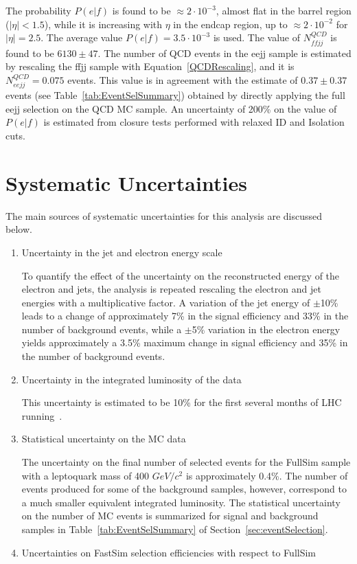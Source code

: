 \documentclass{cmspaper}
\begin{document}
\begin{linenumbers}
The probability $P(e|f)$ is found to be $\approx 2 \cdot 10^{-3}$, almost flat in the barrel region ($|\eta|<1.5$), while 
it is increasing with $\eta$ in the endcap region, up to $\approx 2 \cdot 10^{-2}$ for $|\eta|=2.5$. 
The average value $P(e|f) = 3.5 \cdot 10^{-3}$ is used.
The value of $N_{ffjj}^{QCD}$ is found to be $6130 \pm 47$. The number of QCD events in the eejj sample is estimated 
by rescaling the ffjj sample with Equation~\ref{QCDRescaling}, and it is $N_{eejj}^{QCD}=0.075$ events.
This value is in agreement with the estimate of $0.37 \pm 0.37$ events 
(see Table~\ref{tab:EventSelSummary}) obtained by directly applying the full eejj 
selection on the QCD MC sample. An uncertainty of 200\% on the value of $P(e|f)$ is estimated 
from closure tests performed with relaxed ID and Isolation cuts. 

\section{Systematic Uncertainties} \label{sec:Systematics}

The main sources of systematic uncertainties for this analysis are discussed below.

%
\begin{enumerate}
\item Uncertainty in the jet and electron energy scale

To quantify the effect of the uncertainty on the reconstructed energy of the electron and jets,
the analysis is repeated rescaling the electron and jet energies
 with a multiplicative factor. 
A variation of the jet energy of $\pm$10\% leads to a change of approximately 
7\% in the signal efficiency and 33\% in the number of background events, 
while a $\pm$5\% variation in the electron energy yields approximately a 3.5\% maximum 
change in signal efficiency and 35\% in the number of background events. 
%
\item Uncertainty in the integrated luminosity of the data

This uncertainty is estimated to be 10\% for the first several months of LHC running~\cite{PTDR}. 
%
\item Statistical uncertainty on the MC data

The uncertainty on the final number of selected events for the FullSim sample with a leptoquark mass of 400 $GeV/c^2$ is 
approximately 0.4\%.  The number of events produced 
for some of the background samples, however, correspond to a much
smaller equivalent integrated luminosity.  
The statistical uncertainty on the number of MC events is summarized for signal and background samples 
in Table~\ref{tab:EventSelSummary} of Section~\ref{sec:eventSelection}.  
%
\item Uncertainties on FastSim selection efficiencies with respect to FullSim


\end{enumerate}
\end{linenumbers}
\end{document}
